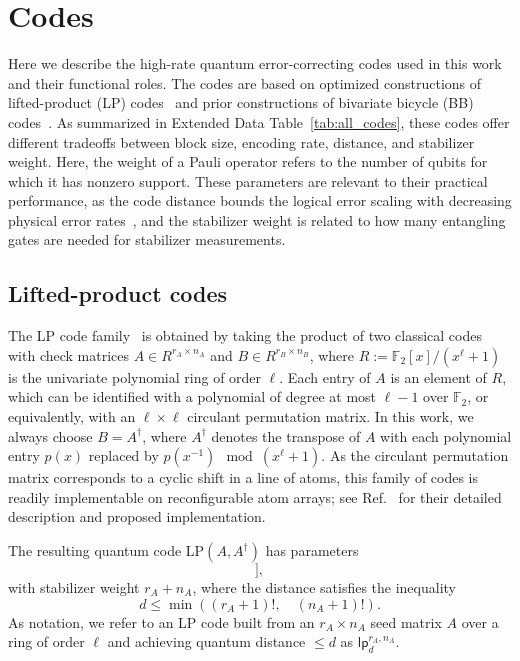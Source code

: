 \documentclass[reprint,twocolumn,secnumarabic,amssymb, aps, prx]{revtex4-2}
\begin{document}
\section{Codes} \label{app:codes}
Here we describe the high-rate quantum error-correcting codes used in this work and their functional roles. The codes are based on optimized constructions of lifted-product (LP) codes~\cite{panteleev2019degenerate, xu2024constant} and prior constructions of bivariate bicycle (BB) codes~\cite{panteleev2021quantum, symons2025sequences}. As summarized in Extended Data Table~\ref{tab:all_codes}, these codes offer different tradeoffs between block size, encoding rate, distance, and stabilizer weight. Here, the weight of a Pauli operator refers to the number of qubits for which it has nonzero support. These parameters are relevant to their practical performance, as the code distance bounds the logical error scaling with decreasing physical error rates~\cite{fowler2012surface}, and the stabilizer weight is related to how many entangling gates are needed for stabilizer measurements.

\subsection{Lifted-product codes\label{app:lp_codes}}

The LP code family~\cite{panteleev2019degenerate} is obtained by taking the product of two classical codes with check matrices \mbox{$A \in R^{r_A \times n_A}$} and $B \in R^{r_B \times n_B}$, where $R := \mathbb{F}_2[x]/(x^\ell + 1)$ is the univariate polynomial ring of order $\ell$. Each entry of $A$ is an element of $R$, which can be identified with a polynomial of degree at most $\ell - 1$ over $\mathbb{F}_2$, or equivalently, with an $\ell \times \ell$ circulant permutation matrix. In this work, we always choose $B = A^{\dagger}$, where $A^{\dagger}$ denotes the transpose of $A$ with each polynomial entry $p(x)$ replaced by \mbox{$p(x^{-1}) \mod (x^\ell + 1)$}. As the circulant permutation matrix corresponds to a cyclic shift in a line of atoms, this family of codes is readily implementable on reconfigurable atom arrays; see Ref.~\cite{xu2024constant} for their detailed description and proposed implementation.

The resulting quantum code $\mathrm{LP}(A, A^{\dagger})$ has parameters
\begin{equation}
  [[n = (r_A^2 + n_A^2)\,\ell,\quad k \geq (n_A - r_A)^2\,\ell,\quad d\,]], \label{eq:lp_parameters}
\end{equation}
with stabilizer weight $r_A + n_A$, where the distance satisfies the inequality~\cite{smarandache2012quasi, raveendran2025minimum}
\begin{equation}
    d \leq \min((r_A+1)!, \quad (n_A+1)!). \label{eq:lp_distance_bound}
\end{equation}
As notation, we refer to an LP code built from an \mbox{$r_A \times n_A$} seed matrix $A$ over a ring of order $\ell$ and achieving quantum distance $\leq d$ as $\mathsf{lp}^{r_A, n_A}_d$. 
\end{document}
